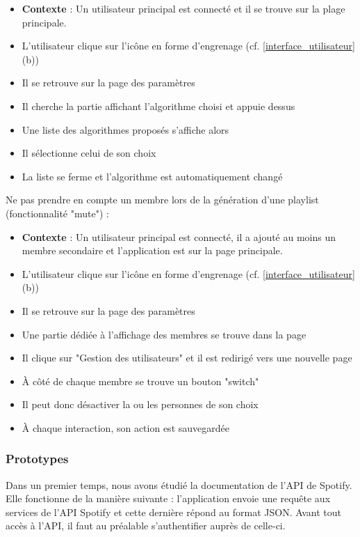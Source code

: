 \documentclass{article}
\begin{document}
		\begin{itemize}
			\item[] \textbf{Contexte} : Un utilisateur principal est connecté et il se trouve sur la plage principale.
			\item L'utilisateur clique sur l'icône en forme d'engrenage (cf. \ref{interface_utilisateur} (b))
			\item Il se retrouve sur la page des paramètres
			\item Il cherche la partie affichant l'algorithme choisi et appuie dessus
			\item Une liste des algorithmes proposés s'affiche alors
			\item Il sélectionne celui de son choix
			\item La liste se ferme et l'algorithme est automatiquement changé
		\end{itemize}
		Ne pas prendre en compte un membre lors de la génération d'une playlist (fonctionnalité "mute") :
		\begin{itemize}
			\item[] \textbf{Contexte} : Un utilisateur principal est connecté, il a ajouté au moins un membre secondaire et l'application est sur la page principale.
			\item L'utilisateur clique sur l'icône en forme d'engrenage (cf. \ref{interface_utilisateur} (b))
			\item Il se retrouve sur la page des paramètres
			\item Une partie dédiée à l'affichage des membres se trouve dans la page
			\item Il clique sur "Gestion des utilisateurs" et il est redirigé vers une nouvelle page
			\item À côté de chaque membre se trouve un bouton "switch"
			\item Il peut donc désactiver la ou les personnes de son choix
			\item À chaque interaction, son action est sauvegardée
		\end{itemize}
								
		\subsubsection{Prototypes}\label{prototype}
								
		Dans un premier temps, nous avons étudié la documentation de l'API de Spotify. Elle fonctionne de la manière suivante : l'application envoie une requête aux services de l'API Spotify et cette dernière répond au format JSON. Avant tout accès à l'API, il faut au préalable s'authentifier auprès de celle-ci.
								
\end{document}
